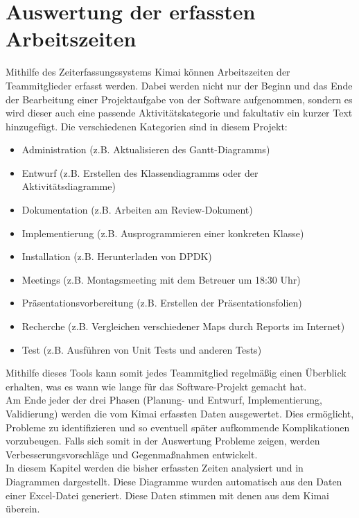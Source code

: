 \documentclass[../review_2.tex]{subfiles}
\begin{document}
\chapter{Auswertung der erfassten Arbeitszeiten}\thispagestyle{fancy}

Mithilfe des  Zeiterfassungssystems Kimai können Arbeitszeiten der Teammitglieder erfasst werden. Dabei werden nicht nur der Beginn und das Ende der Bearbeitung einer Projektaufgabe von der Software aufgenommen, sondern es wird dieser auch eine passende Aktivitätskategorie und fakultativ ein kurzer Text hinzugefügt. Die verschiedenen Kategorien sind in diesem Projekt: 
\begin{itemize}
    \setlength{\parskip}{-0.2pt}
    \item Administration (z.B. Aktualisieren des Gantt-Diagramms)
    \item Entwurf (z.B. Erstellen des Klassendiagramms oder der Aktivitätsdiagramme)
    \item Dokumentation (z.B. Arbeiten am Review-Dokument)
    \item Implementierung (z.B. Ausprogrammieren einer konkreten Klasse)
    \item Installation (z.B. Herunterladen von DPDK)
    \item Meetings (z.B. Montagsmeeting mit dem Betreuer um 18:30 Uhr)
    \item Präsentationsvorbereitung (z.B. Erstellen der Präsentationsfolien)
    \item Recherche (z.B. Vergleichen verschiedener Maps durch Reports im Internet)
    \item Test (z.B. Ausführen von Unit Tests und anderen Tests)
\end{itemize}
Mithilfe dieses Tools kann somit jedes Teammitglied regelmäßig einen Überblick erhalten, was es wann wie lange für das Software-Projekt gemacht hat. \\
Am Ende jeder der drei Phasen (Planung- und Entwurf, Implementierung, Validierung) werden die vom Kimai erfassten Daten ausgewertet. Dies ermöglicht, Probleme zu identifizieren und so eventuell später aufkommende Komplikationen vorzubeugen. Falls sich somit in der Auswertung Probleme zeigen, werden Verbesserungsvorschläge und Gegenmaßnahmen entwickelt. \\
In diesem Kapitel werden die bisher erfassten Zeiten analysiert und in Diagrammen dargestellt. Diese Diagramme wurden automatisch aus den Daten einer Excel-Datei generiert. Diese Daten stimmen mit denen aus dem Kimai überein. %
\end{document}

